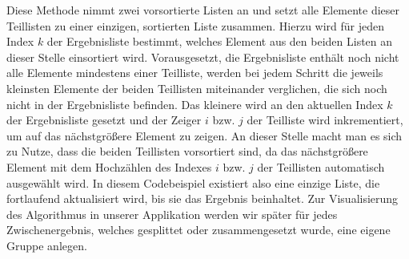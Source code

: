 Diese Methode nimmt zwei vorsortierte Listen an und setzt alle Elemente dieser Teillisten zu einer einzigen, sortierten Liste zusammen. Hierzu wird für jeden Index $k$ der Ergebnisliste bestimmt, welches Element aus den beiden Listen an dieser Stelle einsortiert wird. Vorausgesetzt, die Ergebnisliste enthält noch nicht alle Elemente mindestens einer Teilliste, werden bei jedem Schritt die jeweils kleinsten Elemente der beiden Teillisten miteinander verglichen, die sich noch nicht in der Ergebnisliste befinden. Das kleinere wird an den aktuellen Index $k$ der Ergebnisliste gesetzt und der Zeiger $i$ bzw. $j$ der Teilliste wird inkrementiert, um auf das nächstgrößere Element zu zeigen. An dieser Stelle macht man es sich zu Nutze, dass die beiden Teillisten vorsortiert sind, da das nächstgrößere Element mit dem Hochzählen des Indexes $i$ bzw. $j$ der Teillisten automatisch ausgewählt wird. In diesem Codebeispiel existiert also eine einzige Liste, die fortlaufend aktualisiert wird, bis sie das Ergebnis beinhaltet. Zur Visualisierung des Algorithmus in unserer Applikation werden wir später für jedes Zwischenergebnis, welches gesplittet oder zusammengesetzt wurde, eine eigene Gruppe anlegen.
